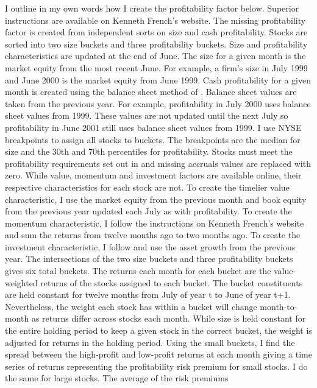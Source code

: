 I outline in my own words how I create the profitability factor below. Superior
instructions are available on Kenneth French’s website. The missing profitability factor
is created from independent sorts on size and cash profitability. Stocks are sorted into
two size buckets and three profitability buckets. Size and profitability characteristics
are updated at the end of June. The size for a given month is the market equity from the
most recent June. For example, a firm’s size in July 1999 and June 2000 is the market
equity from June 1999. Cash profitability for a given month is created using the balance
sheet method of \textcite{ball2016accruals}. Balance sheet values are taken from the
previous year. For example, profitability in July 2000 uses balance sheet values from
1999. These values are not updated until the next July so profitability in June 2001 still
uses balance sheet values from 1999. I use NYSE breakpoints to assign all stocks to
buckets. The breakpoints are the median for size and the 30th and 70th percentiles for
profitability. Stocks must meet the profitability requirements set out in
\textcite{fama2015five} and missing accruals values are replaced with zero. While value,
momentum and investment factors are available online, their respective characteristics for
each stock are not. To create the timelier value characteristic, I use the market equity
from the previous month and book equity from the previous year updated each July as with
profitability. To create the momentum characteristic, I follow the instructions on Kenneth
French’s website and sum the returns from twelve months ago to two months ago. To create
the investment characteristic, I follow \textcite{fama2015five} and use the asset growth
from the previous year. The intersections of the two size buckets and three profitability
buckets gives six total buckets. The returns each month for each bucket are the value-
weighted returns of the stocks assigned to each bucket. The bucket constituents are held
constant for twelve months from July of year t to June of year t+1. Nevertheless, the
weight each stock has within a bucket will change month-to-month as returns differ across
stocks each month. While size is held constant for the entire holding period to keep a
given stock in the correct bucket, the weight is adjusted for returns in the holding
period. Using the small buckets, I find the spread between the high-profit and low-profit
returns at each month giving a time series of returns representing the profitability risk
premium for small stocks. I do the same for large stocks. The average of the risk premiums
